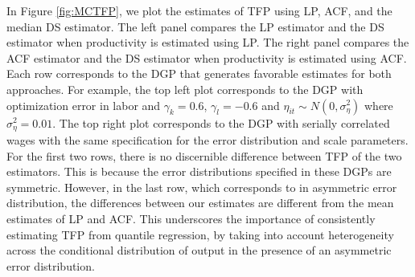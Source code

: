 \documentclass[12pt]{article}
\begin{document}
In Figure \ref{fig:MCTFP}, we plot the estimates of TFP using LP, ACF, and the median DS estimator. The left panel compares the LP estimator and the DS estimator when productivity is estimated using LP. The right panel compares the ACF estimator and the DS estimator when productivity is estimated using ACF. Each row corresponds to the DGP that generates favorable estimates for both approaches. For example, the top left plot corresponds to the DGP with optimization error in labor and $\gamma_{k}=0.6$, $\gamma_{l}=-0.6$ and $\eta_{it}\sim N(0,\sigma_{\eta}^{2})$ where $\sigma_{\eta}^{2}=0.01$. The top right plot corresponds to the DGP with serially correlated wages with the same specification for the error distribution and scale parameters. For the first two rows, there is no discernible difference between TFP of the two estimators. This is because the error distributions specified in these DGPs are symmetric. However, in the last row, which corresponds to in asymmetric error distribution, the differences between our estimates are different from the mean estimates of LP and ACF. This underscores the importance of consistently estimating TFP from quantile regression, by taking into account heterogeneity across the conditional distribution of output in the presence of an asymmetric error distribution.
\pagebreak
\newpage
\end{document}
